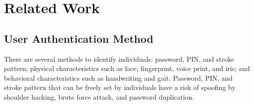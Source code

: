 \documentclass[sigchi,authordraft]{acmart}
\begin{document}


\section{Related Work}
\label{sec:related}


\subsection{User Authentication Method}
There are several methods to identify individuals: password, PIN, and stroke pattern; physical characteristics such as face, fingerprint, voice print, and iris; and behavioral characteristics such as handwriting and gait. Password, PIN, and stroke pattern that can be freely set by individuals have a risk of spoofing by shoulder hacking, brute force attack, and password duplication.\par

\end{document}
